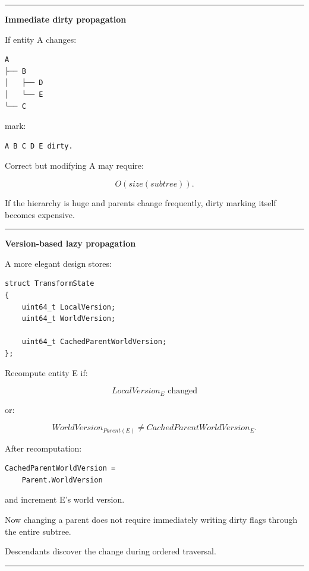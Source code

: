 \begin{center}\rule{0.5\linewidth}{0.5pt}\end{center}

\textbf{Immediate dirty propagation}

If entity A changes:

\begin{verbatim}
A
├── B
│   ├── D
│   └── E
└── C
\end{verbatim}

mark:

\begin{verbatim}
A B C D E dirty.
\end{verbatim}

Correct but modifying A may require:

\[
O(size(subtree)).
\]

If the hierarchy is huge and parents change frequently, dirty marking itself becomes expensive.

\begin{center}\rule{0.5\linewidth}{0.5pt}\end{center}

\textbf{Version-based lazy propagation}

A more elegant design stores:

\begin{verbatim}
struct TransformState
{
    uint64_t LocalVersion;
    uint64_t WorldVersion;

    uint64_t CachedParentWorldVersion;
};
\end{verbatim}

Recompute entity E if:

\[
LocalVersion_E
\text{ changed}
\]

or:

\[
WorldVersion_{Parent(E)}
\neq
CachedParentWorldVersion_E.
\]

After recomputation:

\begin{verbatim}
CachedParentWorldVersion =
    Parent.WorldVersion
\end{verbatim}

and increment E's world version.

Now changing a parent does not require immediately writing dirty flags through the entire subtree.

Descendants discover the change during ordered traversal.

\begin{center}\rule{0.5\linewidth}{0.5pt}\end{center}

